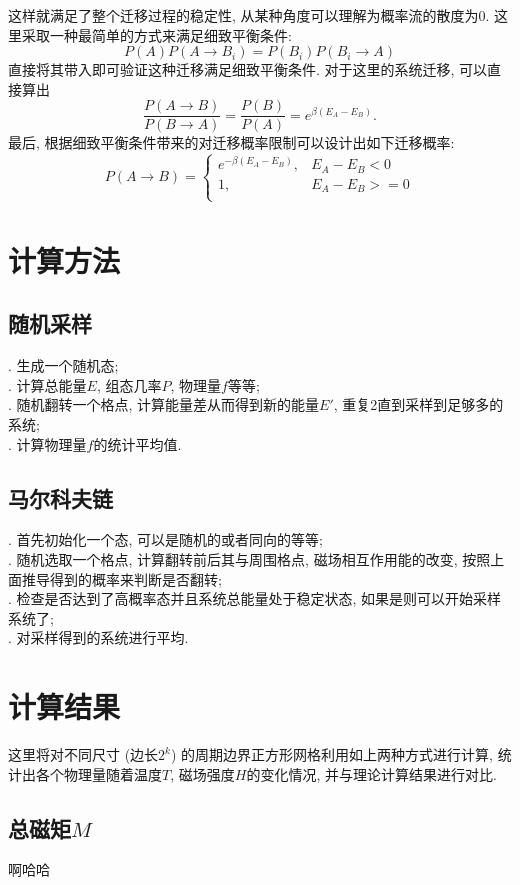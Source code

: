 \documentclass[UTF8]{ctexart}
\begin{document}
            这样就满足了整个迁移过程的稳定性, 从某种角度可以理解为概率流的散度为0. 这里采取一种最简单的方式来满足细致平衡条件:
            \begin{equation}
                P(A)P(A\rightarrow B_i)=P(B_i)P(B_i\rightarrow A)
            \end{equation}
            直接将其带入即可验证这种迁移满足细致平衡条件. 对于这里的系统迁移, 可以直接算出
            \begin{equation}
                \dfrac{P(A\rightarrow B)}{P(B\rightarrow A)}=\dfrac{P(B)}{P(A)}=e^{\beta(E_A-E_B)}.
            \end{equation}
            \indent 最后, 根据细致平衡条件带来的对迁移概率限制可以设计出如下迁移概率:
            \begin{equation}
                P(A\rightarrow B)=
                \left\{
                    \begin{array}{ll}
                        e^{-\beta(E_A-E_B)}, &E_A-E_B<0\\
                        1, &E_A-E_B>=0\\
                    \end{array}
                \right.
            \end{equation}
    \section{计算方法}
        \subsection{随机采样}
            . 生成一个随机态;\\
            . 计算总能量$E$, 组态几率$P$, 物理量$f$等等;\\
            . 随机翻转一个格点, 计算能量差从而得到新的能量$E'$, 重复2直到采样到足够多的系统;\\
            . 计算物理量$f$的统计平均值.
        \subsection{马尔科夫链}
            . 首先初始化一个态, 可以是随机的或者同向的等等;\\
            . 随机选取一个格点, 计算翻转前后其与周围格点, 磁场相互作用能的改变, 按照上面推导得到的概率来判断是否翻转;\\
            . 检查是否达到了高概率态并且系统总能量处于稳定状态, 如果是则可以开始采样系统了;\\
            . 对采样得到的系统进行平均.
    \section{计算结果}
        \indent 这里将对不同尺寸 (边长$2^k$) 的周期边界正方形网格利用如上两种方式进行计算, 统计出各个物理量随着温度$T$, 磁场强度$H$的变化情况,
        并与理论计算结果进行对比.
        \subsection{总磁矩$M$}
            啊哈哈
\end{document}
